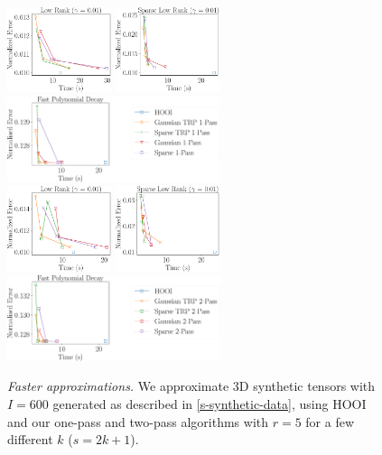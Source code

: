 \begin{figure}
	\includegraphics[height=2.5cm]{figure/lk_1pass_time.pdf}
	\includegraphics[height=2.5cm]{figure/slk_1pass_time.pdf}
	\includegraphics[height=2.5cm]{figure/fpd_1pass_time.pdf}\\
	\centering
	\includegraphics[height=2.5cm]{figure/lk_2pass_time.pdf}
	\includegraphics[height=2.5cm]{figure/slk_2pass_time.pdf}
	\includegraphics[height=2.5cm]{figure/fpd_2pass_time.pdf}\\
	\centering
	\caption{
	\textit{Faster approximations.}
	We approximate 3D synthetic tensors with $I = 600$ generated
	as described in \ref{s-synthetic-data},
	using HOOI and our one-pass and two-pass algorithms with $r = 5$
	for a few different $k$ ($s = 2k+1$).
}\label{fig:run_time}
\end{figure}

